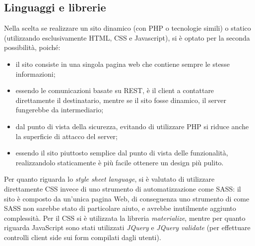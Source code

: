 \subsection{Linguaggi e librerie}
Nella scelta se realizzare un sito dinamico (con PHP o tecnologie simili) o statico (utilizzando esclusivamente HTML, CSS e Javascript), si è optato per la seconda possibilità, poiché:
\begin{itemize}
 \item il sito consiste in una singola pagina web che contiene sempre le stesse informazioni;
 \item essendo le comunicazioni basate su REST, è il client a contattare direttamente il destinatario, mentre se il sito fosse dinamico, il server fungerebbe da intermediario;
 \item dal punto di vista della sicurezza, evitando di utilizzare PHP si riduce anche la superficie di attacco del server;
 \item essendo il sito piuttosto semplice dal punto di vista delle funzionalità, realizzandolo staticamente è più facile ottenere un design più pulito.
\end{itemize}
Per quanto riguarda lo \textit{style sheet language}, si è valutato di utilizzare direttamente CSS invece di uno strumento di automatizzazione come SASS:
il sito è composto da un'unica pagina Web, di conseguenza uno strumento di come SASS non sarebbe stato di particolare aiuto, e avrebbe inutilmente aggiunto complessità.
Per il CSS si è utilizzata la libreria \textit{materialize}, mentre per quanto riguarda JavaScript sono stati utilizzati \textit{JQuery} e \textit{JQuery validate} (per effettuare controlli client side sui form compilati dagli utenti).

